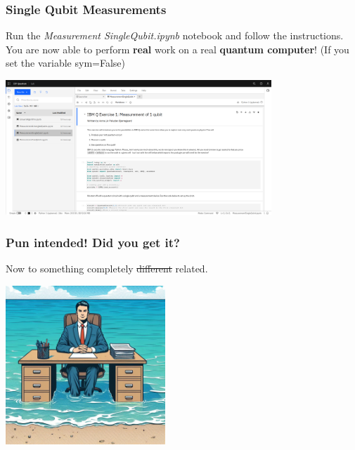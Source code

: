 \documentclass[10pt]{beamer}
\begin{document}
\begin{frame}
  \frametitle{Single Qubit Measurements}
  Run the \emph{Measurement SingleQubit.ipynb} notebook and follow the instructions. You are now able to perform \textbf{real} work on a real \textbf{quantum computer}! (If you set the variable sym=False)
  \begin{center}
  \includegraphics[width=10cm]{img/ibmq-single-qubit.png}
  \end{center}
\end{frame}

\begin{frame}
  \frametitle{Pun intended! Did you get it?}
 \footnotesize Now to something completely \sout{different} related.
  \begin{center}
  \includegraphics[width=6cm]{img/completely_different.jpeg}
  \end{center}
\end{frame}
\end{document}
